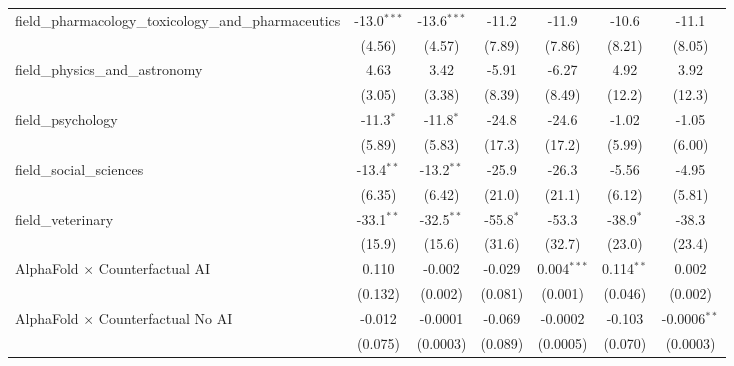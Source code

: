 \begin{tabular}{lcccccc}
   field\_pharmacology\_toxicology\_and\_pharmaceutics         & -13.0$^{***}$ & -13.6$^{***}$ & -11.2         & -11.9         & -10.6         & -11.1\\   
                                                               & (4.56)        & (4.57)        & (7.89)        & (7.86)        & (8.21)        & (8.05)\\   
   field\_physics\_and\_astronomy                              & 4.63          & 3.42          & -5.91         & -6.27         & 4.92          & 3.92\\   
                                                               & (3.05)        & (3.38)        & (8.39)        & (8.49)        & (12.2)        & (12.3)\\   
   field\_psychology                                           & -11.3$^{*}$   & -11.8$^{*}$   & -24.8         & -24.6         & -1.02         & -1.05\\   
                                                               & (5.89)        & (5.83)        & (17.3)        & (17.2)        & (5.99)        & (6.00)\\   
   field\_social\_sciences                                     & -13.4$^{**}$  & -13.2$^{**}$  & -25.9         & -26.3         & -5.56         & -4.95\\   
                                                               & (6.35)        & (6.42)        & (21.0)        & (21.1)        & (6.12)        & (5.81)\\   
   field\_veterinary                                           & -33.1$^{**}$  & -32.5$^{**}$  & -55.8$^{*}$   & -53.3         & -38.9$^{*}$   & -38.3\\   
                                                               & (15.9)        & (15.6)        & (31.6)        & (32.7)        & (23.0)        & (23.4)\\   
   AlphaFold $\times$ Counterfactual AI                        & 0.110         & -0.002        & -0.029        & 0.004$^{***}$ & 0.114$^{**}$  & 0.002\\   
                                                               & (0.132)       & (0.002)       & (0.081)       & (0.001)       & (0.046)       & (0.002)\\   
   AlphaFold $\times$ Counterfactual No AI                     & -0.012        & -0.0001       & -0.069        & -0.0002       & -0.103        & -0.0006$^{**}$\\   
                                                               & (0.075)       & (0.0003)      & (0.089)       & (0.0005)      & (0.070)       & (0.0003)\\   

\end{tabular}

